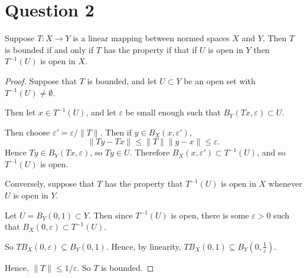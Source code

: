\documentclass{unswmaths}
\begin{document}
%    
%    
    

\section*{Question 2}
\begin{theorem}
    Suppose $T:X\rightarrow Y$ is a linear mapping between normed spaces $X$ and $Y$. Then $T$ is bounded
    if and only if $T$ has the property if that if $U$ is open in $Y$ then $T^{-1}(U)$ is open in $X$.
\end{theorem}
\begin{proof}
    Suppose that $T$ is bounded, and let $U\subset Y$ be an open set with $T^{-1}(U) \neq \emptyset$. 
    
    Then let $x \in T^{-1}(U)$, and let $\varepsilon$ be small enough such that $B_Y(Tx,\varepsilon) \subset U$. 
    
    Then choose $\varepsilon' = \varepsilon/\|T\|$. Then if $y \in B_X(x, \varepsilon')$, 
    \begin{equation*}
        \|Ty-Tx\| \leq \|T\|\|y-x\| \leq \varepsilon.
    \end{equation*}
    Hence $Ty \in B_Y(Tx,\varepsilon)$, so $Ty \in U$. Therefore $B_X(x,\varepsilon') \subset T^{-1}(U)$, and so $T^{-1}(U)$
    is open.
    
    Conversely, suppose that $T$ has the property that $T^{-1}(U)$ is open in $X$ whenever $U$ is open in $Y$.
    
    Let $U = B_Y(0,1) \subset Y$. Then since $T^{-1}(U)$ is open, there is some $\varepsilon > 0$ such
    that $B_X(0,\varepsilon) \subset T^{-1}(U)$.
    
    So $TB_X(0,\varepsilon) \subseteq B_Y(0,1)$. Hence, by linearity, $TB_X(0,1) \subseteq B_Y(0,\frac{1}{\varepsilon})$.
    
    Hence, $\|T\| \leq 1/\varepsilon$. So $T$ is bounded.
    
\end{proof}
\end{document}
